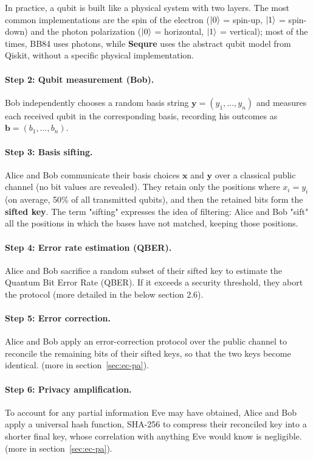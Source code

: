 \documentclass[12pt, a4paper]{article}
\begin{document}
In practice, a qubit is built like a physical system with two layers. The most common implementations are the spin of the electron ($\ket{0}$ = spin-up, $\ket{1}$ = spin-down) and the photon polarization ($\ket{0}$ = horizontal, $\ket{1}$ = vertical); most of the times, BB84 uses photons, while \textbf{Sequre} uses the abstract qubit model from Qiskit, without a specific physical implementation.

\paragraph{Step 2: Qubit measurement (Bob).}
Bob independently chooses a random basis string $\mathbf{y} = (y_1, \ldots, y_n)$
and measures each received qubit in the corresponding basis, recording his
outcomes as $\mathbf{b} = (b_1, \ldots, b_n)$.

\paragraph{Step 3: Basis sifting.}
Alice and Bob communicate their basis choices $\mathbf{x}$ and $\mathbf{y}$
over a classical public channel (no bit values are revealed). They retain
only the positions where $x_i = y_i$ (on average, 50\% of all transmitted
qubits), and then the retained bits form the \textbf{sifted key}. The term "sifting" expresses the idea of filtering: Alice and Bob "sift" all the 
positions in which the bases have not matched, keeping those positions.

\paragraph{Step 4: Error rate estimation (QBER).}
Alice and Bob sacrifice a random subset of their sifted key to estimate the
Quantum Bit Error Rate (QBER). If it exceeds a security threshold, they
abort the protocol (more detailed in the below section 2.6).

\paragraph{Step 5: Error correction.}
Alice and Bob apply an error-correction protocol over the public channel to
reconcile the remaining bits of their sifted keys, so that the two keys become identical.
(more in section~\ref{sec:ec-pa}).

\paragraph{Step 6: Privacy amplification.}
To account for any partial information Eve may have obtained, Alice and Bob
apply a universal hash function, SHA-256 to compress their reconciled key into a shorter final key, whose correlation with anything Eve would know is negligible. 
(more in section~\ref{sec:ec-pa}).
\end{document}

